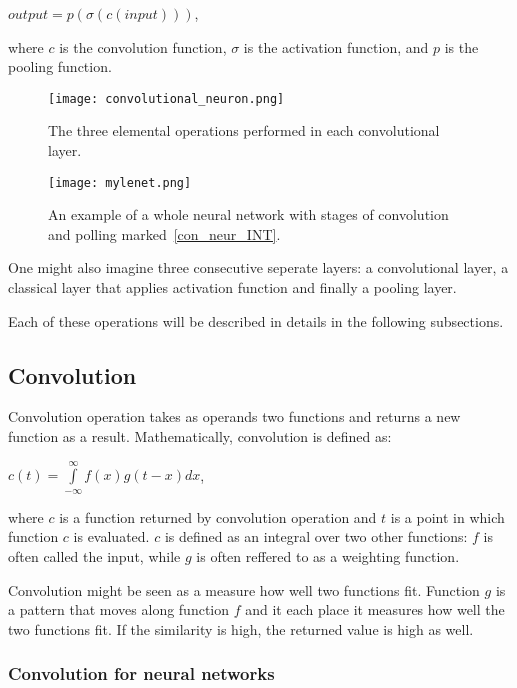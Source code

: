\documentclass[a4paper,10pt]{report}
\begin{document}
	\begin{center}
	$output = p(\sigma(c(input)))$, 
	\end{center}
	
	
	where $c$ is the convolution function, $\sigma$ is the activation function, and $p$ is the pooling function. 
	
	\begin{figure}[h!]
	  \centering
	  \texttt{[image: convolutional\_neuron.png]}
	  \caption{The three elemental operations performed in each convolutional layer.}
	  \label{fig:con_neur}
	\end{figure} 
	
	\begin{figure}[h!] %
	  \centering
	  \texttt{[image: mylenet.png]}
	  \caption{An example of a whole neural network with stages of convolution and polling marked~\ref{con_neur_INT}.}
	  \label{fig:con_neur_INT}
	\end{figure} 
	One might also imagine three consecutive seperate layers: a convolutional layer, a classical layer that applies activation function and finally a pooling layer. 
	
	Each of these operations will be described in details in the following subsections. 
	
	\subsection{Convolution}\label{sec:convolution}
	Convolution operation takes as operands two functions and returns a new function as a result. Mathematically, convolution is defined as:  
	\begin{center}
	$c(t) = \int\limits_{-\infty}^\infty f(x)g(t-x)dx$, 
	\end{center}
	
	where $c$ is a function returned by convolution operation and $t$ is a point in which function $c$ is evaluated. $c$ is defined as an integral over two other functions: $f$ is often called the input, while $g$ is often reffered to as a weighting function. 
	
	Convolution might be seen as a measure how well two functions fit. Function $g$ is a pattern that moves along function $f$ and it each place it measures how well the two functions fit. If the similarity is high, the returned value is high as well. 
		
	\subsubsection{Convolution for neural networks}
	  
\end{document}
